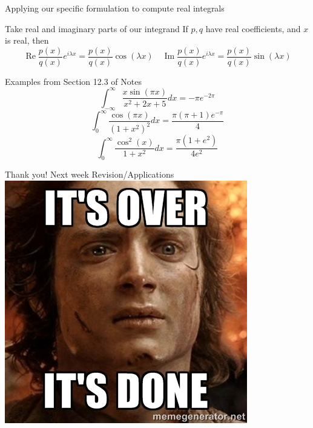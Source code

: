 \documentclass{beamer}
\DeclareMathOperator{\Real}{Re}
\DeclareMathOperator{\Imag}{Im}
\begin{document}
\begin{frame}{Applying our specific formulation to compute real integrals}

\begin{block}{Take real and imaginary parts of our integrand}
If $p,q$ have real coefficients, and $x$ is real, then
$$\Real \frac{p(x)}{q(x)}e^{i\lambda x}=\frac{p(x)}{q(x)}\cos(\lambda x)\quad \Imag \frac{p(x)}{q(x)}e^{i\lambda x}=\frac{p(x)}{q(x)}\sin(\lambda x)$$
\end{block}
\begin{block}{Examples from Section 12.3 of Notes}
$$\int_{-\infty}^\infty \frac{x\sin(\pi x)}{x^2+2x+5}dx=-\pi e^{-2\pi}$$
$$\int_0^\infty \frac{\cos(\pi x)}{(1+x^2)^2}dx=\frac{\pi(\pi+1)e^{-\pi}}{4}$$
$$\int_{0}^\infty \frac{\cos^2(x)}{1+x^2}dx=\frac{\pi(1+e^2)}{4e^2}$$





\end{block}
\end{frame}
\begin{frame}{Thank you! Next week Revision/Applications}
\center
\includegraphics[width=\textwidth,height=.9\textheight,keepaspectratio]{ItsOver.jpg}

\end{frame}
\end{document}
